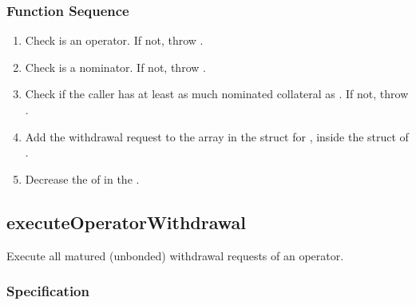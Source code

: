 \documentclass[a4paper,10pt,english]{sphinxmanual}
\begin{document}
\subsubsection{Function Sequence}
\label{\detokenize{spec/nomination:id24}}\begin{enumerate}
%
\item {} 
Check  is an operator. If not, throw .

\item {} 
Check  is a nominator. If not, throw .

\item {} 
Check if the caller has at least as much nominated collateral as . If not, throw .

\item {} 
Add the withdrawal request to the  array in the  struct for , inside the  struct of .

\item {} 
Decrease the  of  in the {\hyperref[\detokenize{spec/vault-registry:vault-registry}]{}}.

\end{enumerate}


\subsection{executeOperatorWithdrawal}
\label{\detokenize{spec/nomination:executeoperatorwithdrawal}}\label{\detokenize{spec/nomination:id25}}
Execute all matured (unbonded) withdrawal requests of an operator.


\subsubsection{Specification}
\label{\detokenize{spec/nomination:id26}}

\end{document}
